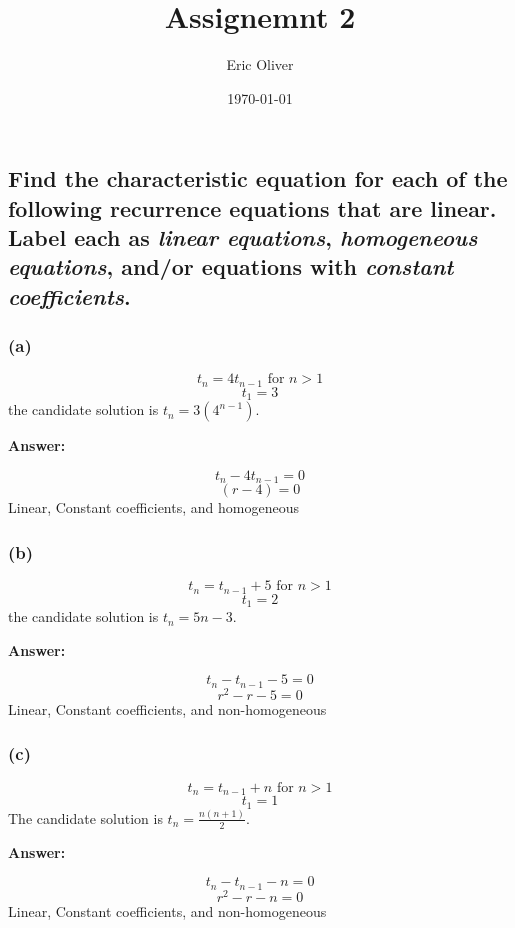 \documentclass[12pt]{report}
\title{Assignemnt 2}
\author{Eric Oliver}
\date{\today}
\begin{document}
\maketitle

\chapter*{}


\section{Find the characteristic equation for each of the following recurrence equations that are linear. Label each
as \emph{linear equations}, \emph{homogeneous equations}, and/or equations with \emph{constant coefficients}.}

\subsection*{(a)}

$$ t_n = 4t_{n-1} \text{ for } n > 1 $$
$$ t_1 = 3 $$
the candidate solution is $ t_n = 3(4^{n-1}) $.

\textbf{Answer:}

$$ t_n - 4t_{n-1} = 0 $$
$$ (r-4) = 0 $$
Linear, Constant coefficients, and homogeneous 

\subsection*{(b)}

$$ t_n = t_{n-1} + 5 \text{ for } n > 1 $$
$$ t_1 = 2 $$
the candidate solution is $ t_n = 5n-3 $.

\textbf{Answer:}

$$ t_n -t_{n-1} - 5 = 0 $$
$$ r^2 - r - 5 = 0 $$
Linear, Constant coefficients, and non-homogeneous


\subsection*{(c)}

$$ t_n = t_{n-1} + n \text{ for } n > 1 $$
$$ t_1 = 1 $$
The candidate solution is $ t_n = \frac{n(n+1)}{2} $.

\textbf{Answer:}

$$ t_n - t_{n-1} - n = 0 $$
$$ r^2 - r - n = 0 $$
Linear, Constant coefficients, and non-homogeneous
\end{document}
